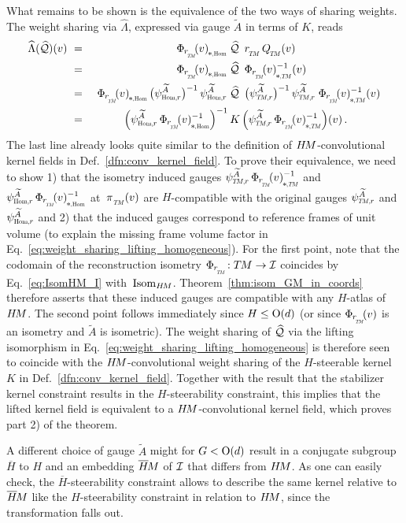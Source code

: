 What remains to be shown is the equivalence of the two ways of sharing weights.
The weight sharing via $\widehat{\Lambda}$, expressed via gauge $\widetilde{A}$ in terms of $K$, reads
\begin{alignat}{3}\label{eq:weight_sharing_lifting_homogeneous}
    \widehat{\Lambda}(\Qhat)(v)
    \ &=&\ \dPhirHom{v}\; &\Qhat\,\ \rTM\, \QTM (v) \notag \\
    \ &=&\ \dPhirHom{v}\; &\Qhat\,\ \dPhirTM{v}^{-1}(v) \notag \\
    \ &=&\ \dPhirHom{v}\, \big(\psiHomr^{\widetilde{A}}\big)^{-1}\, \psiHomr^{\widetilde{A}}\; &\Qhat\,\ \big(\psiTMr^{\widetilde{A}}\big)^{-1}\, \psiTMr^{\widetilde{A}}\; \dPhirTM{v}^{-1}(v) \notag \\
    \ &=&\ \Big( \psiHomr^{\widetilde{A}}\, \dPhirHom{v}^{-1} \Big)^{-1}\, &K\, \Big( \psiTMr^{\widetilde{A}}\, \dPhirTM{v}^{-1} \Big)(v) \,.
\end{alignat}
The last line already looks quite similar to the definition of $H\mkern-2.5muM$-convolutional kernel fields in Def.~\ref{dfn:conv_kernel_field}.
To prove their equivalence, we need to show
1) that the isometry induced gauges 
$\psiTMr^{\widetilde{A}}\, \dPhirTM{v}^{-1}$ and $\psiHomr^{\widetilde{A}}\, \dPhirHom{v}^{-1}$ at~$\piTM(v)$
are $H$-compatible with the original gauges $\psiTMr^{\widetilde{A}}$ and $\psiHomr^{\widetilde{A}}$ and
2) that the induced gauges correspond to reference frames of unit volume (to explain the missing frame volume factor in Eq.~\eqref{eq:weight_sharing_lifting_homogeneous}).
For the first point, note that the codomain of the reconstruction isometry $\PhirNoArg: \TM \to \I$ coincides by Eq.~\eqref{eq:IsomHM_I} with~$\operatorname{Isom}_{H\mkern-2.5muM}$.
Theorem~\ref{thm:isom_GM_in_coords} therefore asserts that these induced gauges are compatible with any $H$-atlas of~$H\mkern-2.5muM$.
The second point follows immediately since $H \leq \operatorname{O}(d)$ (or since $\Phir{v}$ is an isometry and $\widetilde{A}$ is isometric).
The weight sharing of $\widehat{\mathcal{Q}}$ via the lifting isomorphism in Eq.~\ref{eq:weight_sharing_lifting_homogeneous} is therefore seen to coincide with the $H\mkern-2.5muM$-convolutional weight sharing of the $H$-steerable kernel~$K$ in Def.~\ref{dfn:conv_kernel_field}.
Together with the result that the stabilizer kernel constraint results in the $H$-steerability constraint, this implies that the lifted kernel field is equivalent to a $H\mkern-2.5muM$-convolutional kernel field, which proves part 2) of the theorem.







A different choice of gauge $\widetilde{A}$ might for $G<\operatorname{O}(d)$ result in a conjugate subgroup $\overline{H}$ to $H$ and an embedding $\overline{H}\mkern-2muM$ of $\mathcal{I}$ that differs from $H\mkern-2.5muM$.
As one can easily check, the $\overline{H}$-steerability constraint allows to describe the same kernel relative to $\overline{H}\mkern-2muM$ like the $H$-steerability constraint in relation to $H\mkern-2.5muM$, since the transformation falls out.
